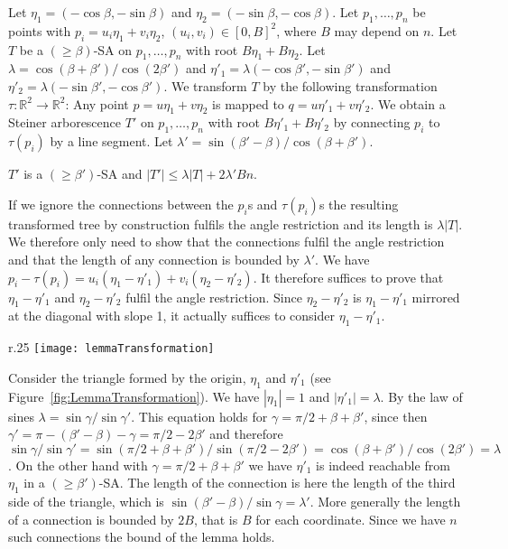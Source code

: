 \documentclass{journalA4}
\begin{document}
Let $\eta_1 = (-\cos \beta, -\sin \beta)$ and $\eta_2 = (-\sin \beta, -\cos \beta)$. Let $p_1, \ldots, p_n$ be points with $p_i = u_i \eta_1 + v_i \eta_2$, $(u_i,v_i) \in [0,B]^2$, where $B$ may depend on $n$. Let $T$ be a $(\geq \beta)$-SA on $p_1, \ldots, p_n$ with root $B \eta_1 + B \eta_2$.
Let $\lambda = \cos ( \beta + \beta')/ \cos (2 \beta')$ and $\eta'_1 = \lambda (-\cos \beta', -\sin \beta')$ and $\eta'_2 = \lambda (-\sin \beta', -\cos \beta')$.
We transform $T$ by the following transformation $\tau \colon \mathbb{R}^2 \rightarrow \mathbb{R}^2$: Any point $p = u \eta_1 + v \eta_2$ is mapped to $q = u \eta'_1 + v \eta'_2$. We obtain a Steiner arborescence $T'$ on $p_1, \ldots, p_n$ with root $B \eta'_1 + B \eta'_2$ by connecting $p_i$ to $\tau (p_i)$ by a line segment. Let $\lambda' = \sin (\beta' - \beta)/ \cos (\beta + \beta')$.
\begin{lemma}\label{lem:transtree}
$T'$ is a $(\geq \beta')$-SA and
$
|T'| \leq \lambda |T| + 2 \lambda' B n.
$
\end{lemma}

 If we ignore the connections between the $p_i$s and $\tau(p_i)$s the resulting transformed tree by construction fulfils the angle restriction and its length is $\lambda |T|$. We therefore only need to show that the connections fulfil the angle restriction and that the length of any connection is bounded by $\lambda'$. We have $p_i - \tau(p_i) = u_i (\eta_1-\eta'_1) + v_i (\eta_2-\eta'_2)$. It therefore suffices to prove that $\eta_1-\eta'_1$ and $\eta_2-\eta'_2$ fulfil the angle restriction. Since $\eta_2-\eta'_2$ is $\eta_1-\eta'_1$ mirrored at the diagonal with slope 1, it actually suffices to consider $\eta_1-\eta'_1$.

\begin{wrapfigure}[8]{r}{.25\textwidth}
  \centering
  \texttt{[image: lemmaTransformation]}
  \small{\caption{Lemma~\ref{lem:transtree}.\label{fig:LemmaTransformation}}}
\end{wrapfigure}

Consider the triangle formed by the origin, $\eta_1$ and $\eta'_1$ (see Figure~\ref{fig:LemmaTransformation}). We have $|\eta_1| = 1$ and $|\eta'_1|=\lambda$. By the law of sines $\lambda = \sin \gamma / \sin \gamma'$. This equation holds for $\gamma = \pi/2 + \beta + \beta'$, since then $\gamma' = \pi - (\beta'-\beta) - \gamma = \pi/2 - 2 \beta'$ and therefore $\sin \gamma / \sin \gamma' = \sin (\pi/2 + \beta + \beta') / \sin (\pi/2 - 2 \beta') = \cos (\beta + \beta')/\cos (2 \beta') = \lambda$. On the other hand with $\gamma = \pi/2 + \beta + \beta'$ we have $\eta'_1$ is indeed reachable from $\eta_1$ in a  $(\geq \beta')$-SA. The length of the connection is here the length of the third side of the triangle, which is $\sin (\beta' - \beta)/\sin \gamma = \lambda'$. More generally the length of a connection is bounded by $2B$, that is $B$ for each coordinate. Since we have $n$ such connections the bound of the lemma holds. \hfill\QED
\medskip
\end{document}
